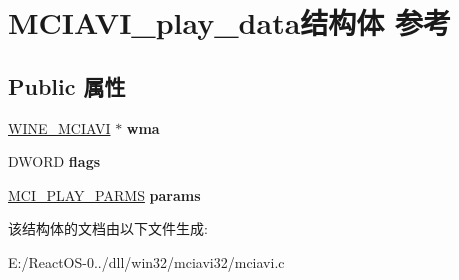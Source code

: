 \hypertarget{struct_m_c_i_a_v_i__play__data}{}\section{M\+C\+I\+A\+V\+I\+\_\+play\+\_\+data结构体 参考}
\label{struct_m_c_i_a_v_i__play__data}
\subsection*{Public 属性}
\begin{DoxyCompactItemize}
\item 
\mbox{\label{struct_m_c_i_a_v_i__play__data_a52c8dccd37b9d944e6618033c858bbba}} 
\hyperlink{struct_w_i_n_e___m_c_i_a_v_i}{W\+I\+N\+E\+\_\+\+M\+C\+I\+A\+VI} $\ast$ {\bfseries wma}
\item 
\mbox{\label{struct_m_c_i_a_v_i__play__data_a7bba7d14aae081dfc8def5373a44d10a}} 
D\+W\+O\+RD {\bfseries flags}
\item 
\mbox{\label{struct_m_c_i_a_v_i__play__data_a4080ddf78871868c9dc47559379967d3}} 
\hyperlink{structtag_m_c_i___p_l_a_y___p_a_r_m_s}{M\+C\+I\+\_\+\+P\+L\+A\+Y\+\_\+\+P\+A\+R\+MS} {\bfseries params}
\end{DoxyCompactItemize}


该结构体的文档由以下文件生成\+:\begin{DoxyCompactItemize}
\item 
E\+:/\+React\+O\+S-\/0../dll/win32/mciavi32/mciavi.\+c\end{DoxyCompactItemize}
